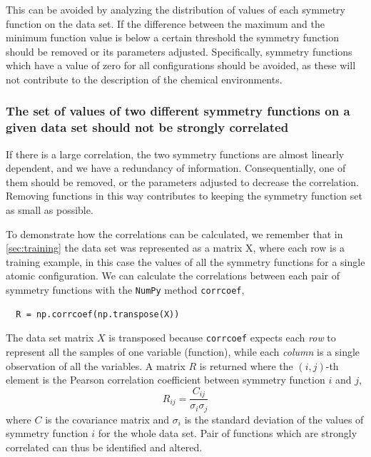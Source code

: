\documentclass[twoside,english]{uiofysmaster}
\begin{document}
This can be avoided by analyzing the distribution of values of each symmetry function on the data set. If the difference 
between the maximum and the minimum function value is below a certain threshold
the symmetry function should be removed or its parameters adjusted. Specifically, 
symmetry functions which have a value of zero for all configurations should be avoided, as these will not contribute
to the description of the chemical environments. 

\subsubsection{The set of values of two different symmetry functions on a given data set should not be strongly correlated}
If there is a large correlation, the two symmetry functions are almost linearly dependent, 
and we have a redundancy of information. Consequentially, one of them should be removed, or the parameters adjusted
to decrease the correlation. Removing functions in this way contributes to keeping the symmetry function set as 
small as possible.

To demonstrate how the correlations can be calculated, we remember that in 
\autoref{sec:training} the data set was represented as a matrix X, where
each row is a training example, in this case the values of all the symmetry functions for a single atomic configuration.
We can calculate the correlations between each pair of symmetry functions with the \texttt{NumPy} method \texttt{corrcoef}, 
\begin{verbatim}
  R = np.corrcoef(np.transpose(X))
\end{verbatim}
The data set matrix $X$ is transposed because \texttt{corrcoef} expects each \textit{row} to represent all the samples of one
variable (function), while each \textit{column} is a single observation of all the variables.
A matrix $R$ is returned where the $(i,j)$-th element is the Pearson correlation coefficient between 
symmetry function $i$ and $j$,
\begin{equation}
 R_{ij} = \frac{C_{ij}}{\sigma_i\sigma_j}
\end{equation}
where $C$ is the covariance matrix and $\sigma_i$ is the standard deviation of the values of symmetry function $i$ for 
the whole data set. Pair of functions which are strongly correlated can thus be identified and altered.
\end{document}
